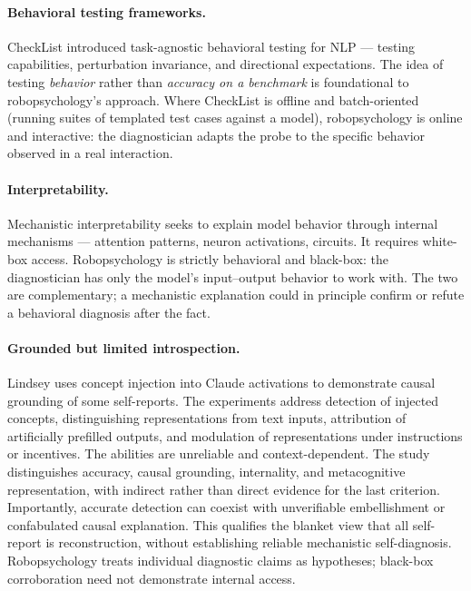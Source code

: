 \paragraph{Behavioral testing frameworks.}
CheckList \citep{ribeiro2020beyond} introduced task-agnostic behavioral
testing for NLP --- testing capabilities, perturbation invariance, and
directional expectations. The idea of testing \emph{behavior} rather
than \emph{accuracy on a benchmark} is foundational to robopsychology's
approach. Where CheckList is offline and batch-oriented (running suites
of templated test cases against a model), robopsychology is online and
interactive: the diagnostician adapts the probe to the specific
behavior observed in a real interaction.

\paragraph{Interpretability.}
Mechanistic interpretability \citep{olah2020zoom, elhage2021mathematical}
seeks to explain model behavior through internal mechanisms ---
attention patterns, neuron activations, circuits. It requires
white-box access. Robopsychology is strictly behavioral and black-box:
the diagnostician has only the model's input--output behavior to work
with. The two are complementary; a mechanistic explanation could in
principle confirm or refute a behavioral diagnosis after the fact.

\paragraph{Grounded but limited introspection.}
Lindsey \citep{lindsey2025introspection} uses concept injection into
Claude activations to demonstrate causal grounding of some self-reports.
The experiments address detection of injected concepts, distinguishing
representations from text inputs, attribution of artificially prefilled
outputs, and modulation of representations under instructions or incentives.
The abilities are unreliable and context-dependent. The study distinguishes
accuracy, causal grounding, internality, and metacognitive representation,
with indirect rather than direct evidence for the last criterion.
Importantly, accurate detection can coexist with unverifiable embellishment
or confabulated causal explanation. This qualifies the blanket view that
all self-report is reconstruction, without establishing reliable mechanistic
self-diagnosis. Robopsychology treats individual diagnostic claims as
hypotheses; black-box corroboration need not demonstrate internal access.

